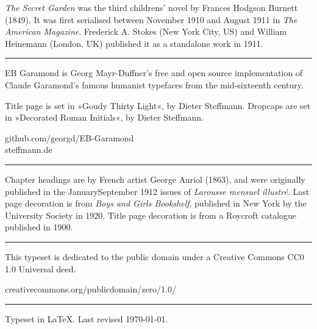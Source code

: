 \documentclass[
a5paper,
]{scrbook}
\begin{document}
\centering
\begin{minipage}{\textwidth}
\textit{The Secret Garden} was the third childrens' novel by Frances Hodgson Burnett (1849). It was first serialised between November 1910 and August 1911 in \textit{The American Magazine}. Frederick A. Stokes (New York City, US) and William Heinemann (London, UK) published it as a standalone work in 1911.
\end{minipage}
\vfill
\rule{0.5\textwidth}{.4pt}
\vfill
\begin{minipage}{\textwidth}
EB Garamond is Georg Mayr-Duffner's free and open source implementation of Claude Garamond’s famous humanist typefaces from the mid-sixteenth century.
\end{minipage}
\vfill
\begin{minipage}{\textwidth}
Title page is set in »Goudy Thirty Light«, by Dieter Steffmann. Dropcaps are set in »Decorated Roman Initials«, by Dieter Steffmann.
\end{minipage}
\vfill
github.com/georgd/EB-Garamond\\
steffmann.de\\
\vfill
\rule{0.5\textwidth}{.4pt}
\vfill
\begin{minipage}{\textwidth}
Chapter headings are by French artist George Auriol (1863), and were originally published in the January\textendash September 1912 issues of \textit{Larousse mensuel illustré}. Last page decoration is from \textit{Boys and Girls Bookshelf}, published in New York by the University Society in 1920. Title page decoration is from a Roycroft catalogue published in 1900.
\end{minipage}

\vfill
\rule{0.5\textwidth}{.4pt}
\vfill

\begin{minipage}{\textwidth}
This typeset is dedicated to the public domain under a Creative Commons CC0 1.0 Universal deed.\end{minipage}
\vfill
creativecommons.org/publicdomain/zero/1.0/
\vfill
\rule{0.5\textwidth}{.4pt}
\vfill

Typeset in \LaTeX{}. Last revised \today.
\thispagestyle{empty}
\end{document}
